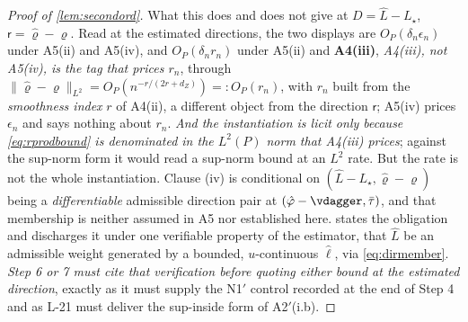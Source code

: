 \begin{proof}[Proof of \cref{lem:secondord}]
What this does and does not give at $D=\hat L-L_\star$, $\mathsf r=\hat\varrho-\varrho$. Read at
the estimated directions, the two
displays are $O_P(\delta_n\epsilon_n)$ under A5(ii) and A5(iv), and $O_P(\delta_nr_n)$ under A5(ii) and
\textbf{A4(iii)}, \emph{A4(iii), not A5(iv), is the tag that prices $r_n$}, through
$\|\hat\varrho-\varrho\|_{L^{2}}=O_P(n^{-r/(2r+d_Z)})=:O_P(r_n)$, with
$r_n$ built from the \emph{smoothness index} $r$ of A4(ii), a different object from the
direction $\mathsf r$; A5(iv) prices $\epsilon_n$ and says nothing about $r_n$. \emph{And the
instantiation is licit only because \eqref{eq:rprodbound} is denominated in the $L^{2}(P)$ norm that
A4(iii) prices}; against the sup-norm form it would read a sup-norm bound at an $L^{2}$ rate.
But the rate is not the whole instantiation. Clause (iv) is conditional on
$(\hat L-L_\star,\hat\varrho-\varrho)$ being a \emph{differentiable} admissible direction pair at
$(\hat\varphi-\vdagger,\bar\tau)$, and that membership is neither assumed in A5 nor established here.
 states the obligation and discharges it under one verifiable property of the
estimator, that $\hat L$ be an admissible weight generated by a bounded, $u$-continuous $\hat\ell$, 
via \eqref{eq:dirmember}. \emph{Step 6 or 7 must cite that verification before quoting either bound at
the estimated direction}, exactly as it must supply the N1$'$ control recorded at the end of Step 4 and
as L-21 must deliver the sup-inside form of A2$'$(i.b).
\end{proof}


